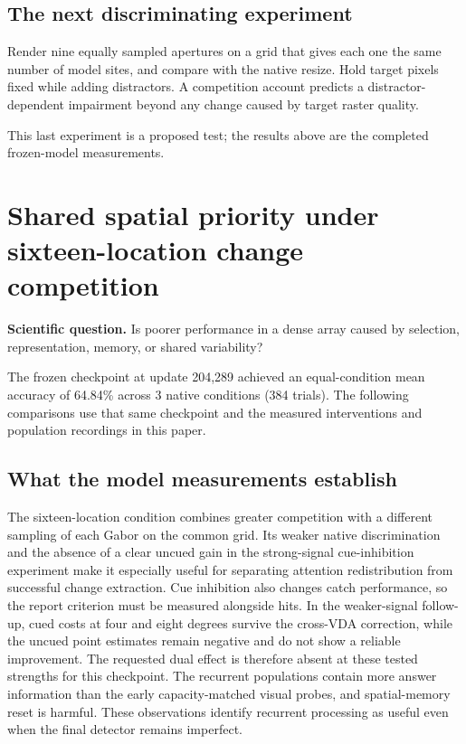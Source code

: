 \documentclass[11pt]{article}
\begin{document}
\subsection{The next discriminating experiment}
Render nine equally sampled apertures on a grid that gives each one the same number of model sites, and compare with the native resize. Hold target pixels fixed while adding distractors. A competition account predicts a distractor-dependent impairment beyond any change caused by target raster quality.

This last experiment is a proposed test; the results above are the completed frozen-model measurements.
\clearpage\section{Shared spatial priority under sixteen-location change competition}
\textbf{Scientific question.} Is poorer performance in a dense array caused by selection, representation, memory, or shared variability?

The frozen checkpoint at update 204,289 achieved an equal-condition mean accuracy of 64.84\% across 3 native conditions (384 trials). The following comparisons use that same checkpoint and the measured interventions and population recordings in this paper.

\subsection{What the model measurements establish}
The sixteen-location condition combines greater competition with a different sampling of each Gabor on the common grid. Its weaker native discrimination and the absence of a clear uncued gain in the strong-signal cue-inhibition experiment make it especially useful for separating attention redistribution from successful change extraction. Cue inhibition also changes catch performance, so the report criterion must be measured alongside hits. In the weaker-signal follow-up, cued costs at four and eight degrees survive the cross-VDA correction, while the uncued point estimates remain negative and do not show a reliable improvement. The requested dual effect is therefore absent at these tested strengths for this checkpoint. The recurrent populations contain more answer information than the early capacity-matched visual probes, and spatial-memory reset is harmful. These observations identify recurrent processing as useful even when the final detector remains imperfect.
\end{document}

